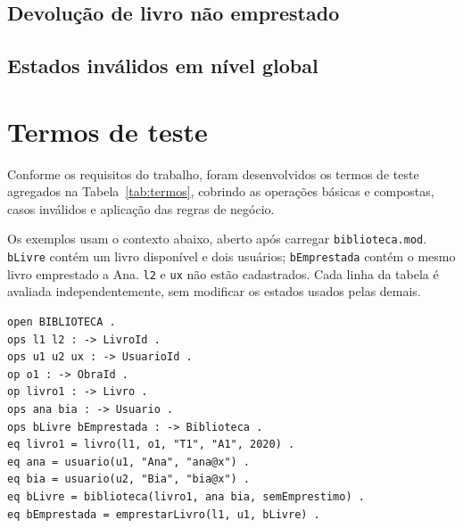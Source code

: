 \documentclass[a4paper,12pt]{article}
\begin{document}
\subsection{Devolução de livro não emprestado}

\subsection{Estados inválidos em nível global}

\section{Termos de teste}

Conforme os requisitos do trabalho, foram desenvolvidos os termos de teste
agregados na Tabela~\ref{tab:termos}, cobrindo as operações básicas e compostas,
casos inválidos e aplicação das regras de negócio.

Os exemplos usam o contexto abaixo, aberto após carregar
\texttt{biblioteca.mod}. \texttt{bLivre} contém um livro disponível e dois
usuários; \texttt{bEmprestada} contém o mesmo livro emprestado a Ana.
\texttt{l2} e \texttt{ux} não estão cadastrados. Cada linha da tabela é
avaliada independentemente, sem modificar os estados usados pelas demais.
\begin{lstlisting}
open BIBLIOTECA .
ops l1 l2 : -> LivroId .
ops u1 u2 ux : -> UsuarioId .
op o1 : -> ObraId .
op livro1 : -> Livro .
ops ana bia : -> Usuario .
ops bLivre bEmprestada : -> Biblioteca .
eq livro1 = livro(l1, o1, "T1", "A1", 2020) .
eq ana = usuario(u1, "Ana", "ana@x") .
eq bia = usuario(u2, "Bia", "bia@x") .
eq bLivre = biblioteca(livro1, ana bia, semEmprestimo) .
eq bEmprestada = emprestarLivro(l1, u1, bLivre) .
\end{lstlisting}
\end{document}
